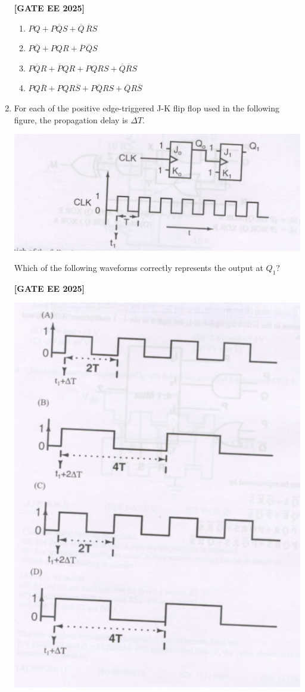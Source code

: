 \documentclass[12pt]{article}
\begin{document}
\begin{enumerate}[leftmargin=*, label=\textbf{Q.\arabic*:}]
\noindent \textbf{[GATE EE 2025]}
\begin{enumerate}
  \item $PQ + P\overline{Q}S + \overline{Q}\, \overline{R}S$
  \item $P\overline{Q} + PQR + \overline{P}\, \overline{Q}S$
  \item $P\overline{Q}R + \overline{P}QR + P Q R S + \overline{Q}\overline{R}S$
  \item $P Q \overline{R} + P Q R \overline{S} + P\overline{Q}RS + \overline{Q}R\overline{S}$
\end{enumerate}

\item For each of the positive edge-triggered J-K flip flop used in the following figure, the propagation delay is $\Delta T$.

\begin{center}
\includegraphics[width=0.6\columnwidth]{figs/q59a.png}
\end{center}

Which of the following waveforms correctly represents the output at $Q_1$?
 
\noindent \textbf{[GATE EE 2025]}
\begin{center}
\includegraphics[width=0.7\columnwidth]{figs/q59b.png}
\end{center}


\end{enumerate}
\end{document}
